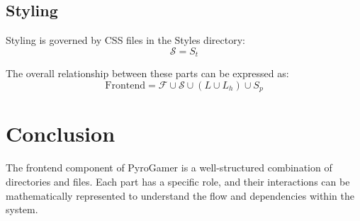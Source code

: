\subsection*{Styling}
Styling is governed by CSS files in the Styles directory:
\[
\mathcal{S} = S_t
\]

The overall relationship between these parts can be expressed as:
\[
\text{Frontend} = \mathcal{F} \cup \mathcal{S} \cup (L \cup L_h) \cup S_p
\]

\section*{Conclusion}
The frontend component of PyroGamer is a well-structured combination of directories and files. Each part has a specific role, and their interactions can be mathematically represented to understand the flow and dependencies within the system.

